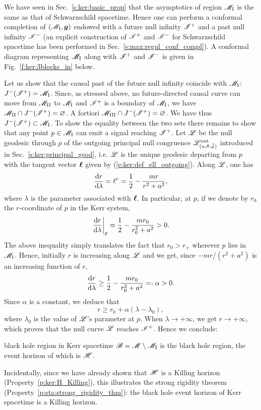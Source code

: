 We have seen in Sec.~\ref{s:ker:basic_prop} that the asymptotics of region $\mathscr{M}_{\rm I}$
is the same as that of Schwarzschild spacetime. Hence one can perform a conformal
completion of $(\mathscr{M}_{\rm I},\bm{g})$ endowed with a future null infinity $\mathscr{I}^+$
and a past null infinity $\mathscr{I}^-$ (an explicit construction of $\mathscr{I}^+$ and
$\mathscr{I}^-$ for Schwarzschild spacetime has been performed in
Sec.~\ref{s:max:regul_conf_compl}). A conformal diagram representing $\mathscr{M}_{\rm I}$
along with $\mathscr{I}^+$
and $\mathscr{I}^-$ is given in Fig.~\ref{f:ker:3blocks_in} below.


Let us show that the causal past of the future null infinity
coincide with $\mathscr{M}_{\rm I}$: $J^{-}(\mathscr{I}^+)=\mathscr{M}_{\rm I}$.
Since, as stressed above, no future-directed causal curve can move from $\mathscr{M}_{\rm II}$ to $\mathscr{M}_{\rm I}$
and $\mathscr{I}^+$ is a boundary of $\mathscr{M}_{\rm I}$, we have $\mathscr{M}_{\rm II} \cap J^{-}(\mathscr{I}^+) = \varnothing$. A fortiori $\mathscr{M}_{\rm III} \cap J^{-}(\mathscr{I}^+) = \varnothing$.
We have thus $J^{-}(\mathscr{I}^+)\subset \mathscr{M}_{\rm I}$. To show the equality between the
two sets there remains to show
that any point $p\in \mathscr{M}_{\rm I}$ can emit a signal reaching $\mathscr{I}^+$.
Let $\mathscr{L}$ be the null geodesic through $p$ of the outgoing principal null
congruence $\mathscr{L}^{\rm out}_{(u,\theta,\tilde{{\tilde\varphi}})}$ introduced in Sec.~\ref{s:ker:principal_geod}, i.e. $\mathscr{L}$ is the unique geodesic departing
from $p$ with the tangent vector $\bm{\ell}$ given by
(\ref{e:ker:def_ell_outgoing}). Along $\mathscr{L}$, one has
\[
   \frac{\mathrm{d} r}{\mathrm{d}\lambda} = \ell^r = \frac{1}{2} - \frac{m r}{r^2 + a^2} ,
\]
where $\lambda$ is the parameter associated with $\bm{\ell}$.
In particular, at $p$, if we denote by $r_0$ the $r$-coordinate of $p$ in the Kerr system,
\[
    \left. \frac{\mathrm{d} r}{\mathrm{d}\lambda} \right| _{p} = \frac{1}{2} - \frac{m r_0}{r_0^2 + a^2} > 0 .
\]
The above inequality simply translates the fact that $r_0 > r_+$ wherever $p$ lies in
$\mathscr{M}_{\rm I}$.
Hence, initially $r$ is increasing along $\mathscr{L}$ and we get, since $-mr/(r^2+a^2)$ is an
increasing function of $r$,
\[
    \frac{\mathrm{d} r}{\mathrm{d}\lambda} \geq \frac{1}{2} - \frac{m r_0}{r_0^2 + a^2} =: \alpha > 0.
\]
Since $\alpha$ is a constant, we deduce that
\[
    r \geq r_0 + \alpha(\lambda - \lambda_0) ,
\]
where $\lambda_0$ is the value of $\mathscr{L}$'s parameter at $p$. When $\lambda\rightarrow +\infty$,
we get $r\rightarrow +\infty$, which proves that the null curve $\mathscr{L}$
reaches $\mathscr{I}^+$. Hence we conclude:
\begin{tprop}{black hole region in Kerr spacetime}{}
$\mathscr{B} = \mathscr{M} \setminus \mathscr{M}_{\rm I}$ is the black hole region, the event
horizon of which is $\mathscr{H}$.
\end{tprop}
Incidentally, since we have already shown that $\mathscr{H}$ is a Killing horizon
(Property~\ref{p:ker:H_Killing}),
this illustrates the strong rigidity theorem
(Property~\ref{p:sta:strong_rigidity_thm}): the
black hole event horizon of Kerr spacetime
is a Killing horizon.

